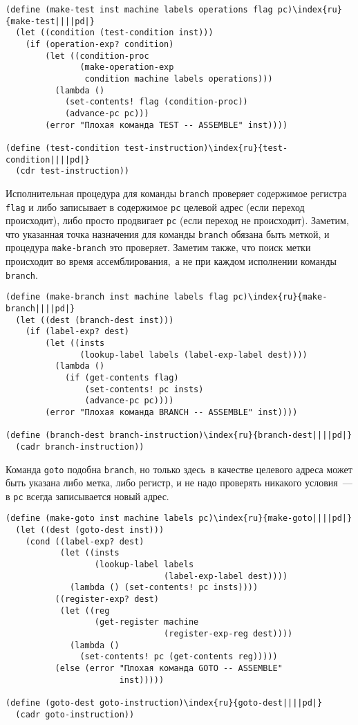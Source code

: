 \begin{Verbatim}[fontsize=\small]
(define (make-test inst machine labels operations flag pc)\index{ru}{make-test||||pd|}
  (let ((condition (test-condition inst)))
    (if (operation-exp? condition)
        (let ((condition-proc
               (make-operation-exp
                condition machine labels operations)))
          (lambda ()
            (set-contents! flag (condition-proc))
            (advance-pc pc)))
        (error "Плохая команда TEST -- ASSEMBLE" inst))))

(define (test-condition test-instruction)\index{ru}{test-condition||||pd|}
  (cdr test-instruction))
\end{Verbatim}

Исполнительная процедура для команды {\tt branch}
проверяет содержимое регистра {\tt flag} и либо записывает в
содержимое {\tt pc} целевой адрес (если переход происходит),
либо просто продвигает {\tt pc} (если переход не происходит).
Заметим, что указанная точка назначения для команды
{\tt branch} обязана быть меткой, и процедура
{\tt make-branch} это проверяет.  Заметим также, что поиск
метки происходит во время ассемблирования,~а не при каждом исполнении
команды {\tt branch}.

\begin{Verbatim}[fontsize=\small]
(define (make-branch inst machine labels flag pc)\index{ru}{make-branch||||pd|}
  (let ((dest (branch-dest inst)))
    (if (label-exp? dest)
        (let ((insts
               (lookup-label labels (label-exp-label dest))))
          (lambda ()
            (if (get-contents flag)
                (set-contents! pc insts)
                (advance-pc pc))))
        (error "Плохая команда BRANCH -- ASSEMBLE" inst))))

(define (branch-dest branch-instruction)\index{ru}{branch-dest||||pd|}
  (cadr branch-instruction))
\end{Verbatim}

Команда {\tt goto} подобна {\tt branch}, но
только здесь~в качестве целевого адреса может быть указана либо метка,
либо регистр, и не надо проверять никакого условия~--- в
{\tt pc} всегда записывается новый адрес.

\begin{Verbatim}[fontsize=\small]
(define (make-goto inst machine labels pc)\index{ru}{make-goto||||pd|}
  (let ((dest (goto-dest inst)))
    (cond ((label-exp? dest)
           (let ((insts
                  (lookup-label labels
                                (label-exp-label dest))))
             (lambda () (set-contents! pc insts))))
          ((register-exp? dest)
           (let ((reg
                  (get-register machine
                                (register-exp-reg dest))))
             (lambda ()
               (set-contents! pc (get-contents reg)))))
          (else (error "Плохая команда GOTO -- ASSEMBLE"
                       inst)))))

(define (goto-dest goto-instruction)\index{ru}{goto-dest||||pd|}
  (cadr goto-instruction))
\end{Verbatim}

